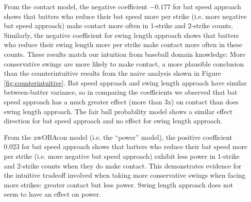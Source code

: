 \documentclass{article}
\begin{document}
      From the contact model, the negative coefficient $-0.177$ for bat speed approach shows that batters who reduce their bat speed more per strike (i.e. more negative bat speed approach) make contact more often in 1-strike and 2-strike counts. Similarly, the negative coefficient for swing length approach shows that batters who reduce their swing length more per strike make contact more often in these counts. These results match our intuition from baseball domain knowledge: More conservative swings are more likely to make contact, a more plausible conclusion than the counterintuitive results from the naive analysis shown in Figure \ref{fig:counterintuitive}. Bat speed approach and swing length approach have similar between-batter variance, so in comparing the coefficients we observed that bat speed approach has a much greater effect (more than 3x) on contact than does swing length approach. The fair ball probability model shows a similar effect direction for bat speed approach and no effect for swing length approach.

      From the xwOBAcon model (i.e. the ``power'' model), the positive coefficient $0.023$ for bat speed approach shows that batters who reduce their bat speed more per strike (i.e. more negative bat speed approach) exhibit less power in 1-strike and 2-strike counts when they do make contact. This demonstrates evidence for the intuitive tradeoff involved when taking more conservative swings when facing more strikes: greater contact but less power. Swing length approach does not seem to have an effect on power.
\end{document}
